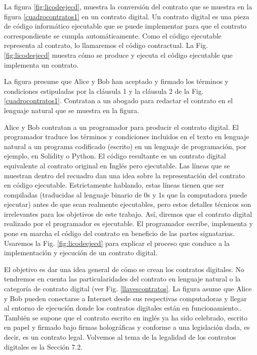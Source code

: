 \documentclass[12pt]{report} %
\begin{document}
La figura \ref{fig:licodeejecd}, muestra la conversión del contrato que se muestra en la figura \ref{cuadrocontratos1} en un contrato digital. Un contrato digital es una pieza de código informático ejecutable que se puede implementar para que  el contrato correspondiente se cumpla automáticamente. Como el código ejecutable representa al contrato, lo llamaremos el código contractual. La Fig.\ref{fig:licodeejecd} muestra cómo se produce y ejecuta el código ejecutable que implementa un contrato. 

La figura presume que Alice y Bob han aceptado y firmado los términos y condiciones estipuladas por la cláusula 1 y la cláusula 2 de la Fig. \ref{cuadrocontratos1}. Contratan a un abogado para redactar el contrato en el lenguaje natural que se muestra en la figura. 

Alice y Bob contratan a un programador para producir el contrato digital. El programador traduce los términos y condiciones incluidos en el texto en lenguaje natural a un programa codificado (escrito) en un lenguaje de programación, por ejemplo, en Solidity o Python. El código resultante es un contrato digital equivalente al contrato original en Inglés pero ejecutable. Las líneas que se muestran dentro del recuadro dan una idea sobre la representación del contrato en código ejecutable. Estrictamente hablando, estas líneas tienen que ser compiladas (traducidas al lenguaje binario de 0s y 1s que la computadora puede ejecutar) antes de que sean realmente ejecutables, pero estos detalles técnicos son irrelevantes para los objetivos de este trabajo. Así, diremos que el contrato digital realizado por el programador es ejecutable. El programador escribe, implementa y pone en marcha el código del contrato en beneficio de las partes signatarias. Usaremos la Fig. \ref{fig:licodeejecd} para explicar el proceso que conduce a la implementación y ejecución de un contrato digital. 

El objetivo es dar una idea general de cómo se crean los contratos digitales. No tendremos en cuenta las particularidades del contrato en lenguaje natural o la categoría de contrato digital (ver Fig. \ref{llavescontratos}. La figura asume que Alice y Bob pueden conectarse a Internet desde sus respectivas computadoras y llegar al entorno de ejecución donde los contratos digitales están en funcionamiento.. También se supone que el contrato escrito en inglés ya ha sido celebrado, escrito en papel y firmado bajo firmas holográficas y conforme a una legislación dada, es decir, es un contrato legal. Volvemos al tema de la legalidad de los contratos digitales es la Sección 7.2.
\end{document}
